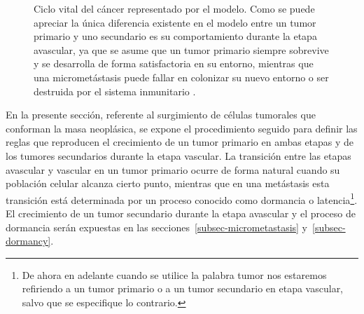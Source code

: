 \begin{figure}[!ht]
\begin{center}
\end{center}\vspace*{-0.6cm}
\caption[Ciclo vital del c\'ancer representado por el modelo]{Ciclo vital del c\'ancer representado por el modelo. Como se puede apreciar la \'unica diferencia existente en el modelo entre un tumor primario y uno secundario es su comportamiento durante la etapa avascular, ya que se asume que un tumor primario siempre sobrevive y se desarrolla de forma satisfactoria en su entorno, mientras que una micromet\'astasis puede fallar en colonizar su nuevo entorno o ser destruida por el sistema inmunitario \cite{viabarre2019}.}
\label{fig-tumor-progresion}
\end{figure}

En la presente secci\'on, referente al surgimiento de c\'elulas tumorales que conforman la masa neopl\'asica, se expone el procedimiento seguido para definir las reglas que reproducen el crecimiento de un tumor primario en ambas etapas y de los tumores secundarios durante la etapa vascular. La transici\'on entre las etapas avascular y vascular en un tumor primario ocurre de forma natural cuando su poblaci\'on celular alcanza cierto punto, mientras que en una met\'astasis esta transici\'on est\'a determinada por un proceso conocido como dormancia o latencia\footnote{De ahora en adelante cuando se utilice la palabra tumor nos estaremos refiriendo a un tumor primario o a un tumor secundario en etapa vascular, salvo que se especifique lo contrario.}. El crecimiento de un tumor secundario durante la etapa avascular y el proceso de dormancia ser\'an expuestas en las secciones~\ref{subsec-micrometastasis} y~\ref{subsec-dormancy}. 

